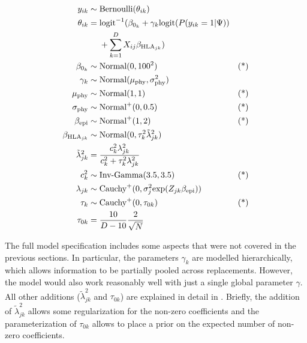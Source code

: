 \documentclass{bioinfo}
\begin{document}
\begin{methods}
\begin{equation}
  \label{eq:full}
  \begin{aligned}
   y_{ik} &\sim \text{Bernoulli}(\theta_{ik}) &\\
   \theta_{ik} &=
        \text{logit}^{-1}(\beta_{0_{k}} + \gamma_{k}\text{logit}(P(y_{ik}=1|\Psi)) & \\
        \hspace{-6cm} &~~~~ +\sum_{k=1}^{D}X_{ij}\beta_{\text{HLA}_{jk}}) & \\
    \beta_{0_{k}} &\sim \text{Normal}(0, 100^2) & \text{(*)}\\
   \gamma_{k} &\sim \text{Normal}(\mu_{\text{phy}}, \sigma_{\text{phy}}^2) & \\
    \mu_{\text{phy}} &\sim \text{Normal}(1, 1) & \text{(*)} \\
   \sigma_{\text{phy}} &\sim \text{Normal}^{+}(0, 0.5) & \text{(*)} \\
   \beta_{\text{epi}} &\sim \text{Normal}^{+}(1, 2) & \text{(*)} \\
   \beta_{\text{HLA}_{jk}} &\sim \text{Normal}(0, \tau_{k}^{2}\tilde{\lambda}^{2}_{jk}) & \\
   \tilde{\lambda}^{2}_{jk} &= \frac{c_{k}^{2}\lambda_{jk}^{2}}{c_{k}^{2} + \tau_{k}^{2}\lambda_{jk}^{2}} & \\
    c_{k}^2 &\sim \text{Inv-Gamma}(3.5, 3.5) & \text{(*)} \\
   \lambda_{jk} &\sim \text{Cauchy}^{+}(0, \sigma_{j}^2\text{exp}(Z_{jk}\beta_{\text{epi}})) & \\
   \tau_{k} &\sim \text{Cauchy}^{+}(0, \tau_{0k}) & \text{(*)} \\
   \tau_{0k} &= \frac{10}{D-10}\frac{2}{\sqrt{N}} & \\
  \end{aligned}
\end{equation}

The full model specification includes some aspects that were not covered in the previous sections. In particular, the parameters \(\gamma_{k}\) are modelled hierarchically, which allows information to be partially pooled across replacements. However, the model would also work reasonably well with just a single global parameter \(\gamma\). All other additions (\(\tilde{\lambda}_{jk}^{2}\) and \(\tau_{0k}\)) are explained in detail in \citep{Piironen2017}. Briefly, the addition of  \(\tilde{\lambda}_{jk}^{2}\) allows some regularization for the non-zero coefficients and the parameterization of \(\tau_{0k}\) allows to place a prior on the expected number of non-zero coefficients.


\end{methods}
\end{document}
